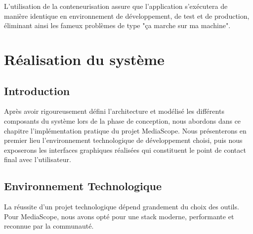\documentclass[12pt,a4paper,oneside]{report}
\begin{document}
L'utilisation de la conteneurisation assure que l'application s'exécutera de manière identique en environnement de développement, de test et de production, éliminant ainsi les fameux problèmes de type "ça marche sur ma machine".

\newpage

\chapter{Réalisation du système}

\section{Introduction}
Après avoir rigoureusement défini l'architecture et modélisé les différents composants du système lors de la phase de conception, nous abordons dans ce chapitre l'implémentation pratique du projet MediaScope. Nous présenterons en premier lieu l'environnement technologique de développement choisi, puis nous exposerons les interfaces graphiques réalisées qui constituent le point de contact final avec l'utilisateur.

\section{Environnement Technologique}
La réussite d'un projet technologique dépend grandement du choix des outils. Pour MediaScope, nous avons opté pour une stack moderne, performante et reconnue par la communauté.
\end{document}
